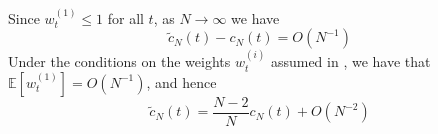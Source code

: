 \documentclass{article}
\newcommand{\E}{\mathbb{E}}
\newcommand{\wt}[2][t]{w_{#1}^{(#2)}}
\begin{document}
Since $\wt{1} \leq 1$ for all $t$, as $N\to\infty$ we have
\begin{equation*}
\tilde{c}_N(t) - c_N(t) = O(N^{-1})
\end{equation*}
Under the conditions on the weights $\wt{i}$ assumed in \citet{koskela2018}, we have that $\E[\wt{1}] = O(N^{-1})$, and hence
\begin{equation*}
\tilde{c}_N(t) = \frac{N-2}{N} c_N(t) + O(N^{-2})
\end{equation*}



\end{document}
